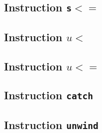 \subsection{Instruction \texttt{s$<=$}}

\subsection{Instruction \texttt{$u<$}}

\subsection{Instruction \texttt{$u<=$}}

\subsection{Instruction \texttt{catch}}

\subsection{Instruction \texttt{unwind}}
